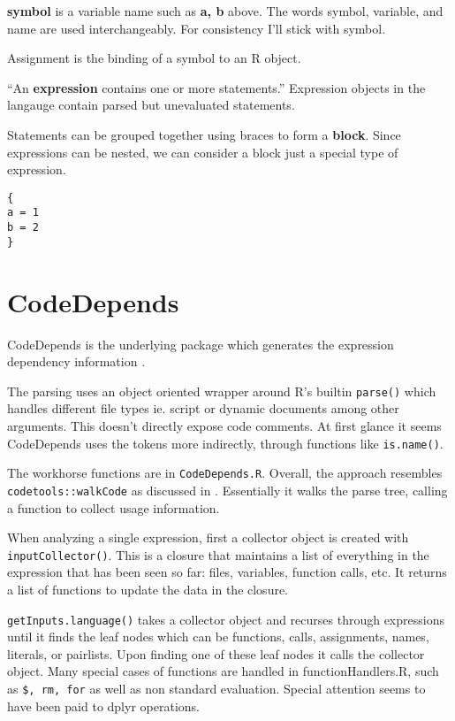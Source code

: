 \documentclass[12pt]{article}
\begin{document}
\textbf{symbol} is a variable name such as \textbf{a, b} above.  The words
symbol, variable, and name are used interchangeably. For consistency I'll
stick with symbol.

Assignment is the binding of a symbol to an R object.

``An \textbf{expression} contains one or more statements.'' Expression objects
in the langauge contain parsed but unevaluated statements. 

Statements can be grouped together using braces to form a \textbf{block}.
Since expressions can be nested, we can consider a block just a special
type of expression.

\begin{verbatim}
{
a = 1
b = 2
}
\end{verbatim}

\section{CodeDepends}

CodeDepends is the underlying package which generates the expression
dependency information \cite{R-CodeDepends}.

The parsing uses an object oriented wrapper around R's builtin \texttt{parse()}
which handles different file types ie. script or dynamic documents among other arguments.
This doesn't directly expose code comments.
At first glance it seems CodeDepends uses the tokens
more indirectly, through functions like \texttt{is.name()}. 

The workhorse functions are in \texttt{CodeDepends.R}. Overall, the
approach resembles \texttt{codetools::walkCode} as discussed in
\cite{chambers2016extending}. Essentially it walks the parse tree, calling
a function to collect usage information.

When analyzing a single expression, first a 
collector object is created with \texttt{inputCollector()}. This is a
closure that maintains a list of everything in the expression that has been seen
so far: files, variables, function calls, etc. It returns a list of
functions to update the data in the closure.

\texttt{getInputs.language()} takes a collector object and
recurses through expressions until it finds the leaf nodes which can be functions, calls, assignments,
names, literals, or pairlists. Upon finding one of these leaf nodes it
calls the collector object. 
Many special cases of functions are handled in functionHandlers.R, such as
\texttt{\$, rm, for} as well as non standard evaluation. Special attention seems
to have been paid to dplyr operations.
\end{document}
